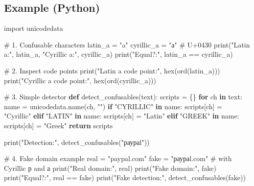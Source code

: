 \documentclass[
  letterpaper,
  DIV=11,
  numbers=noendperiod]{scrreprt}
\newenvironment{Shaded}{\begin{snugshade}}{\end{snugshade}}
\newcommand{\BuiltInTok}[1]{\textcolor[rgb]{0.00,0.23,0.31}{#1}}
\newcommand{\CommentTok}[1]{\textcolor[rgb]{0.37,0.37,0.37}{#1}}
\newcommand{\ControlFlowTok}[1]{\textcolor[rgb]{0.00,0.23,0.31}{\textbf{#1}}}
\newcommand{\ImportTok}[1]{\textcolor[rgb]{0.00,0.46,0.62}{#1}}
\newcommand{\KeywordTok}[1]{\textcolor[rgb]{0.00,0.23,0.31}{\textbf{#1}}}
\newcommand{\NormalTok}[1]{\textcolor[rgb]{0.00,0.23,0.31}{#1}}
\newcommand{\OperatorTok}[1]{\textcolor[rgb]{0.37,0.37,0.37}{#1}}
\newcommand{\StringTok}[1]{\textcolor[rgb]{0.13,0.47,0.30}{#1}}
\begin{document}
\subsection{Example (Python)}\label{example-python-7}

\begin{Shaded}
\begin{Highlighting}[]
\ImportTok{import}\NormalTok{ unicodedata}

\CommentTok{\# 1. Confusable characters}
\NormalTok{latin\_a }\OperatorTok{=} \StringTok{"a"}
\NormalTok{cyrillic\_a }\OperatorTok{=} \StringTok{"а"}  \CommentTok{\# U+0430}
\BuiltInTok{print}\NormalTok{(}\StringTok{"Latin a:"}\NormalTok{, latin\_a, }\StringTok{"Cyrillic a:"}\NormalTok{, cyrillic\_a)}
\BuiltInTok{print}\NormalTok{(}\StringTok{"Equal?:"}\NormalTok{, latin\_a }\OperatorTok{==}\NormalTok{ cyrillic\_a)}

\CommentTok{\# 2. Inspect code points}
\BuiltInTok{print}\NormalTok{(}\StringTok{"Latin a code point:"}\NormalTok{, }\BuiltInTok{hex}\NormalTok{(}\BuiltInTok{ord}\NormalTok{(latin\_a)))}
\BuiltInTok{print}\NormalTok{(}\StringTok{"Cyrillic a code point:"}\NormalTok{, }\BuiltInTok{hex}\NormalTok{(}\BuiltInTok{ord}\NormalTok{(cyrillic\_a)))}

\CommentTok{\# 3. Simple detector}
\KeywordTok{def}\NormalTok{ detect\_confusables(text):}
\NormalTok{    scripts }\OperatorTok{=}\NormalTok{ \{\}}
    \ControlFlowTok{for}\NormalTok{ ch }\KeywordTok{in}\NormalTok{ text:}
\NormalTok{        name }\OperatorTok{=}\NormalTok{ unicodedata.name(ch, }\StringTok{""}\NormalTok{)}
        \ControlFlowTok{if} \StringTok{"CYRILLIC"} \KeywordTok{in}\NormalTok{ name:}
\NormalTok{            scripts[ch] }\OperatorTok{=} \StringTok{"Cyrillic"}
        \ControlFlowTok{elif} \StringTok{"LATIN"} \KeywordTok{in}\NormalTok{ name:}
\NormalTok{            scripts[ch] }\OperatorTok{=} \StringTok{"Latin"}
        \ControlFlowTok{elif} \StringTok{"GREEK"} \KeywordTok{in}\NormalTok{ name:}
\NormalTok{            scripts[ch] }\OperatorTok{=} \StringTok{"Greek"}
    \ControlFlowTok{return}\NormalTok{ scripts}

\BuiltInTok{print}\NormalTok{(}\StringTok{"Detection:"}\NormalTok{, detect\_confusables(}\StringTok{"раураl"}\NormalTok{))}

\CommentTok{\# 4. Fake domain example}
\NormalTok{real }\OperatorTok{=} \StringTok{"paypal.com"}
\NormalTok{fake }\OperatorTok{=} \StringTok{"раураl.com"}  \CommentTok{\# with Cyrillic \textquotesingle{}р\textquotesingle{} and \textquotesingle{}а\textquotesingle{}}
\BuiltInTok{print}\NormalTok{(}\StringTok{"Real domain:"}\NormalTok{, real)}
\BuiltInTok{print}\NormalTok{(}\StringTok{"Fake domain:"}\NormalTok{, fake)}
\BuiltInTok{print}\NormalTok{(}\StringTok{"Equal?:"}\NormalTok{, real }\OperatorTok{==}\NormalTok{ fake)}
\BuiltInTok{print}\NormalTok{(}\StringTok{"Fake detection:"}\NormalTok{, detect\_confusables(fake))}
\end{Highlighting}
\end{Shaded}
\end{document}
